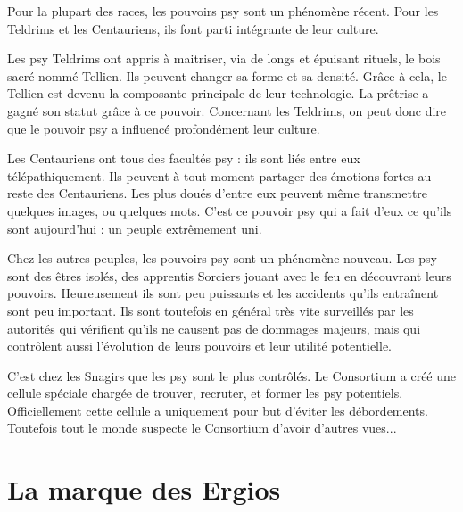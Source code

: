 \begin{multicols}{2}

Pour la plupart des races, les pouvoirs psy sont un phénomène récent. Pour les Teldrims et les Centauriens, ils font parti intégrante de leur culture.

Les psy Teldrims ont appris à maitriser, via de longs et épuisant rituels, le bois sacré nommé Tellien. Ils peuvent changer sa forme et sa densité. Grâce à cela, le Tellien est devenu la composante principale de leur technologie. La prêtrise a gagné son statut grâce à ce pouvoir. Concernant les Teldrims, on peut donc dire que le pouvoir psy a influencé profondément leur culture.

Les Centauriens ont tous des facultés psy : ils sont liés entre eux télépathiquement. Ils peuvent à tout moment partager des émotions fortes au reste des Centauriens. Les plus doués d'entre eux peuvent même transmettre quelques images, ou quelques mots. C'est ce pouvoir psy qui a fait d'eux ce qu'ils sont aujourd'hui : un peuple extrêmement uni.

Chez les autres peuples, les pouvoirs psy sont un phénomène nouveau. Les psy sont des êtres isolés, des apprentis Sorciers jouant avec le feu en découvrant leurs pouvoirs. Heureusement ils sont peu puissants et les accidents qu'ils entraînent sont peu important. Ils sont toutefois en général très vite surveillés par les autorités qui vérifient qu'ils ne causent pas de dommages majeurs, mais qui contrôlent aussi l'évolution de leurs pouvoirs et leur utilité potentielle.

C'est chez les Snagirs que les psy sont le plus contrôlés. Le Consortium a créé une cellule spéciale chargée de trouver, recruter, et former les psy potentiels. Officiellement cette cellule a uniquement pour but d'éviter les débordements. Toutefois tout le monde suspecte le Consortium d'avoir d'autres vues...

\end{multicols}

\chapter{La marque des Ergios}

